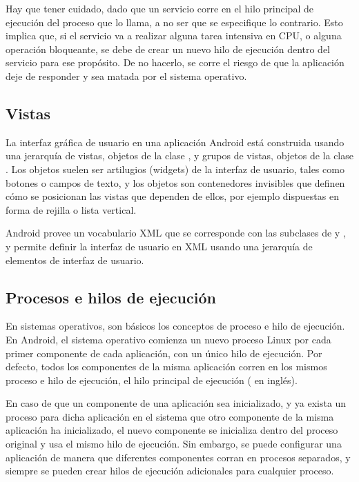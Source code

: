 Hay que tener cuidado, dado que un servicio corre en el hilo principal de ejecución del proceso que lo llama, a no ser que se especifique lo contrario. Esto implica que, si el servicio va a realizar alguna tarea intensiva en CPU, o alguna operación bloqueante, se debe de crear un nuevo hilo de ejecución dentro del servicio para ese propósito. De no hacerlo, se corre el riesgo de que la aplicación deje de responder y sea matada por el sistema operativo.


\subsection{Vistas}

La interfaz gráfica de usuario en una aplicación Android está construida usando una jerarquía de vistas, objetos de la clase , y grupos de vistas, objetos de la clase . Los objetos  suelen ser artilugios (widgets) de la interfaz de usuario, tales como botones o campos de texto, y los objetos  son contenedores invisibles que definen cómo se posicionan las vistas que dependen de ellos, por ejemplo dispuestas en forma de rejilla o lista vertical.

Android provee un vocabulario XML que se corresponde con las subclases de  y , y permite definir la interfaz de usuario en XML usando una jerarquía de elementos de interfaz de usuario.

\subsection{Procesos e hilos de ejecución}

En sistemas operativos, son básicos los conceptos de proceso e hilo de ejecución. En Android, el sistema operativo comienza un nuevo proceso Linux por cada primer componente de cada aplicación, con un único hilo de ejecución. Por defecto, todos los componentes de la misma aplicación corren en los mismos proceso e hilo de ejecución, el hilo principal de ejecución ( en inglés). 

En caso de que un componente de una aplicación sea inicializado, y ya exista un proceso para dicha aplicación en el sistema que otro componente de la misma aplicación ha inicializado, el nuevo componente se inicializa dentro del proceso original y usa el mismo hilo de ejecución. Sin embargo, se puede configurar una aplicación de manera que diferentes componentes corran en procesos separados, y siempre se pueden crear hilos de ejecución adicionales para cualquier proceso.

